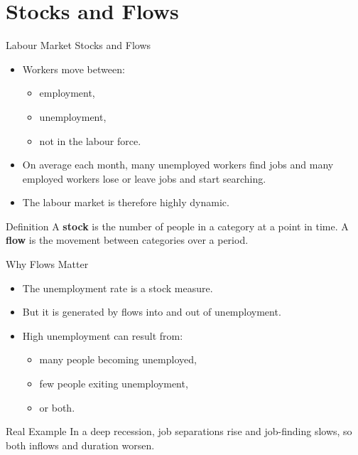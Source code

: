 \documentclass[aspectratio=169]{beamer}
\begin{document}
\section{Stocks and Flows}

\begin{frame}{Labour Market Stocks and Flows}
\transfade
\begin{itemize}
  \item Workers move between:
  \begin{itemize}
    \item employment,
    \item unemployment,
    \item not in the labour force.
  \end{itemize}
  \item On average each month, many unemployed workers find jobs and many employed workers lose or leave jobs and start searching.
  \item The labour market is therefore highly dynamic.
\end{itemize}

\begin{block}{Definition}
A \textbf{stock} is the number of people in a category at a point in time. A \textbf{flow} is the movement between categories over a period.
\end{block}
\end{frame}

\begin{frame}{Why Flows Matter}
\transfade
\begin{itemize}
  \item The unemployment rate is a stock measure.
  \item But it is generated by flows into and out of unemployment.
  \item High unemployment can result from:
  \begin{itemize}
    \item many people becoming unemployed,
    \item few people exiting unemployment,
    \item or both.
  \end{itemize}
\end{itemize}

\begin{exampleblock}{Real Example}
In a deep recession, job separations rise and job-finding slows, so both inflows and duration worsen.
\end{exampleblock}
\end{frame}
\end{document}
